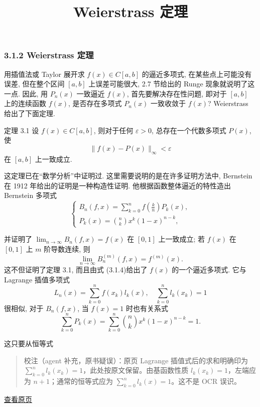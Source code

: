 \documentclass[
  10pt,
  fontset=fandol]{ctexart}
\title{Weierstrass 定理}
\author{}
\date{}
\begin{document}
\maketitle

\subsubsection{3.1.2 Weierstrass 定理}\label{weierstrass-ux5b9aux7406}

用插值法或 Taylor 展开求 \(f(x) \in C[a,b]\) 的逼近多项式, 在某些点上可能没有误差, 但在整个区间 \([a,b]\) 上误差可能很大, 2.7 节给出的 Runge 现象就说明了这一点. 因此, 用 \(P_{n}(x)\) 一致逼近 \(f(x)\), 首先要解决存在性问题, 即对于 \([a,b]\) 上的连续函数 \(f(x)\), 是否存在多项式 \(P_{n}(x)\) 一致收敛于 \(f(x)\)? Weierstrass 给出了下面定理.

定理 3.1 设 \(f(x) \in C[a,b]\), 则对于任何 \(\varepsilon > 0\), 总存在一个代数多项式 \(P(x)\), 使 \[
\| f(x) - P(x) \|_{\infty} < \varepsilon
\] 在 \([a,b]\) 上一致成立.

这定理已在``数学分析''中证明过. 这里需要说明的是在许多证明方法中, Bernstein 在 1912 年给出的证明是一种构造性证明. 他根据函数整体逼近的特性造出 Bernstein 多项式 \[
\begin{cases} B_{n}(f,x) = \sum_{k=0}^{n} f\left(\frac{k}{n}\right) P_{k}(x), \\ P_{k}(x) = \binom{n}{k} x^{k}(1-x)^{n-k}, \end{cases} \tag{3.1.4}
\]

并证明了 \(\lim_{n \to \infty} B_{n}(f,x) = f(x)\) 在 \([0,1]\) 上一致成立; 若 \(f(x)\) 在 \([0,1]\) 上 \(m\) 阶导数连续, 则 \[
\lim_{n \to \infty} B_{n}^{(m)}(f,x) = f^{(m)}(x).
\] 这不但证明了定理 3.1, 而且由式 (3.1.4)给出了 \(f(x)\) 的一个逼近多项式. 它与 Lagrange 插值多项式 \[
L_{n}(x) = \sum_{k=0}^{n} f\left(x_{k}\right) l_{k}(x), \quad \sum_{k=0}^{n} l_{k}(x_{k}) = 1
\] 很相似, 对于 \(B_{n}(f,x)\), 当 \(f(x)=1\) 时也有关系式 \[
\sum_{k=0}^{n} P_{k}(x) = \sum_{k=0}^{n} \binom{n}{k} x^{k}(1-x)^{n-k} = 1. \tag{3.1.5}
\]

这只要从恒等式

\begin{quote}
校注（agent 补充，原书疑误）：原页 Lagrange 插值式后的求和明确印为 \(\sum_{k=0}^{n}l_k(x_k)=1\)，此处按原文保留。由基函数性质 \(l_k(x_k)=1\)，左端应为 \(n+1\)；通常的恒等式应为 \(\sum_{k=0}^{n}l_k(x)=1\)。这不是 OCR 误识。
\end{quote}

\href{../../source-images/pdf-060.jpeg}{查看原页}
\end{document}

